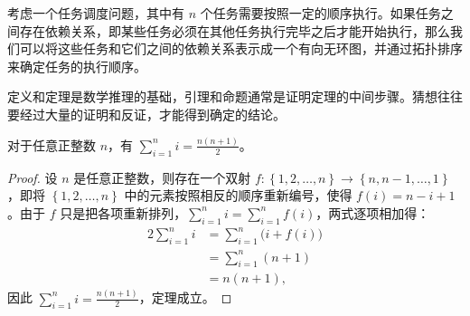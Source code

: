 \begin{exmp}
  考虑一个任务调度问题，其中有 $n$ 个任务需要按照一定的顺序执行。如果任务之间存在依赖关系，即某些任务必须在其他任务执行完毕之后才能开始执行，那么我们可以将这些任务和它们之间的依赖关系表示成一个有向无环图，并通过拓扑排序来确定任务的执行顺序。
\end{exmp}

\begin{rem}
  定义和定理是数学推理的基础，引理和命题通常是证明定理的中间步骤。猜想往往要经过大量的证明和反证，才能得到确定的结论。
\end{rem}

\begin{thm}
  对于任意正整数 $n$，有 $\displaystyle\sum_{i=1}^n i = \frac{n(n+1)}{2}$。
\end{thm}

\begin{proof}
  设 $n$ 是任意正整数，则存在一个双射 $f: \left\{1,2,\dots,n\right\} \rightarrow \left\{n,n-1,\dots,1\right\}$，即将 $\left\{1,2,\dots,n\right\}$ 中的元素按照相反的顺序重新编号，使得 $f(i) = n-i+1$。由于 $f$ 只是把各项重新排列，$\sum_{i=1}^n i = \sum_{i=1}^n f(i)$，两式逐项相加得：
  \begin{align*}
    2\sum_{i=1}^n i & = \sum_{i=1}^n \bigl(i + f(i)\bigr) \\
                    & = \sum_{i=1}^n (n+1)                \\
                    & = n(n+1),
  \end{align*}
  因此 $\sum_{i=1}^n i = \frac{n(n+1)}{2}$，定理成立。
\end{proof}
